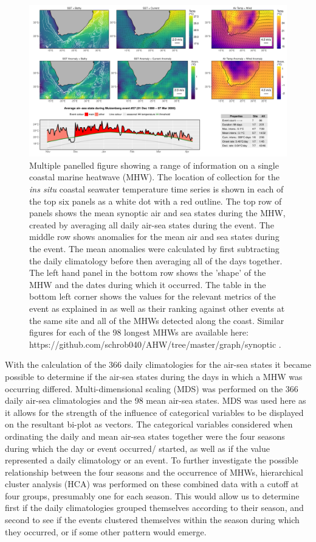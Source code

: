 \documentclass[a4paper,10pt,review]{elsarticle}
\begin{document}
\begin{figure}
\includegraphics[width=1.0\textwidth]{figure_2.pdf}
\caption{Multiple panelled figure showing a range of information on a single coastal marine heatwave (MHW). The location of collection for the \emph{ins situ} coastal seawater temperature time series is shown in each of the top six panels as a white dot with a red outline. The top row of panels shows the mean synoptic air and sea states during the MHW, created by averaging all daily air-sea states during the event. The middle row shows anomalies for the mean air and sea states during the event. The mean anomalies were calculated by first subtracting the daily climatology before then averaging all of the days together. The left hand panel in the bottom row shows the 'shape' of the MHW and the dates during which it occurred. The table in the bottom left corner shows the values for the relevant metrics of the event as explained in  as well as their ranking against other events at the same site and all of the MHWs detected along the coast. Similar figures for each of the 98 longest MHWs are available here: https://github.com/schrob040/AHW/tree/master/graph/synoptic .}
\label{figure2}
\end{figure}

With the calculation of the 366 daily climatologies for the air-sea states it became possible to determine if the air-sea states during the days in which a MHW was occurring differed. Multi-dimensional scaling (MDS) was performed on the 366 daily air-sea climatologies and the 98 mean air-sea states. MDS was used here as it allows for the strength of the influence of categorical variables to be displayed on the resultant bi-plot as vectors. The categorical variables considered when ordinating the daily and mean air-sea states together were the four seasons during which the day or event occurred/ started, as well as if the value represented a daily climatology or an event. To further investigate the possible relationship between the four seasons and the occurrence of MHWs, hierarchical cluster analysis (HCA) was performed on these combined data with a cutoff at four groups, presumably one for each season. This would allow us to determine first if the daily climatologies grouped themselves according to their season, and second to see if the events clustered themselves within the season during which they occurred, or if some other pattern would emerge.
\end{document}
